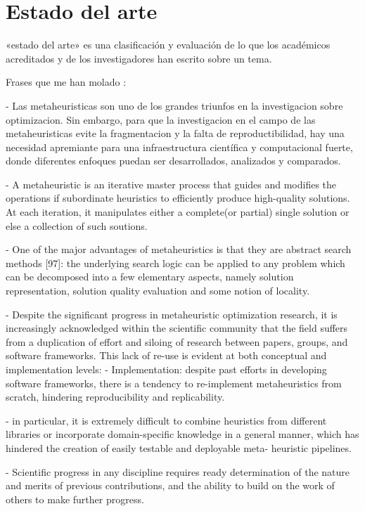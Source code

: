 \chapter{Estado del arte}

«estado del arte» es una clasificación y evaluación de lo que los académicos acreditados y de los investigadores han escrito sobre un tema.

Frases que me han molado
\cite{arXiv:2011.09821} :

- Las metaheuristicas son uno de los grandes triunfos en la investigacion sobre optimizacion. Sin embargo, para que la investigacion
en el campo de las metaheuristicas evite la fragmentacion y la falta de reproductibilidad, hay una necesidad apremiante para
una infraestructura científica y computacional fuerte, donde diferentes enfoques puedan ser desarrollados, analizados y
comparados.

- A metaheuristic is an iterative master process that guides and modifies the operations if subordinate heuristics to
efficiently produce high-quality solutions. At each iteration, it manipulates either a complete(or partial) single solution
or else a collection of such soutions.

- One of the major advantages of metaheuristics is that they are abstract search methods [97]: the underlying search logic can be
applied to any problem which can be decomposed into a few elementary aspects, namely solution representation,
solution quality evaluation and some notion of locality.

- Despite the significant progress in metaheuristic optimization research, it is increasingly acknowledged within
the scientific community that the field suffers from a duplication of effort and siloing of research between papers,
groups, and software frameworks. This lack of re-use is evident at both conceptual and implementation levels:
 - Implementation: despite past efforts in developing software frameworks, there is a tendency to re-implement
metaheuristics from scratch, hindering reproducibility and replicability.

-  in particular, it is extremely difficult to combine heuristics from different libraries or incorporate domain-specific
knowledge in a general manner, which has hindered the creation of easily testable and deployable meta- heuristic pipelines.

- Scientific progress in any discipline requires ready determination of the nature and merits of previous contributions,
and the ability to build on the work of others to make further progress.